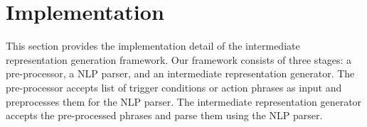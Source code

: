 
\section{Implementation}
\label{sec:implementation}

This section provides the implementation detail of the intermediate representation generation framework. Our framework consists of three stages: a pre-processor, a NLP parser, and an intermediate representation generator. The pre-processor accepts list of trigger conditions or action phrases as input and preprocesses them for the NLP parser. The intermediate representation generator accepts the pre-processed phrases and parse them using the NLP parser.







